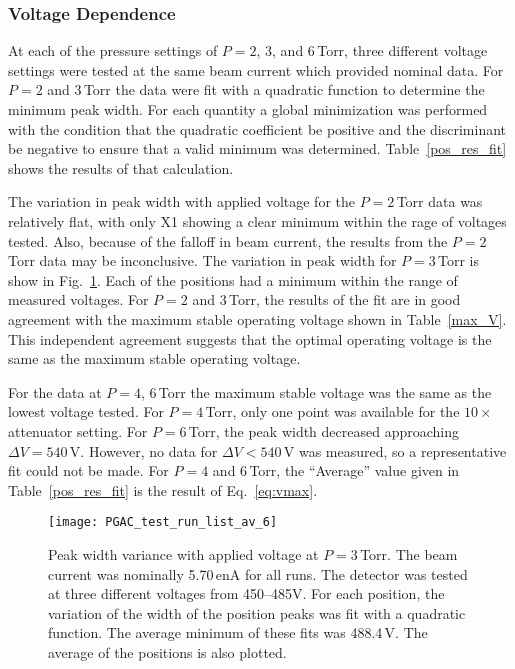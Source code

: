 \subsubsection{Voltage Dependence}
At each of the pressure settings of $P=2$, 3, and 6\,Torr, three different voltage settings were tested at the same beam current which provided nominal data.
For $P=2$ and 3\,Torr  %
the data were fit with a quadratic function to determine 
the minimum peak width. %
For each quantity a global minimization was performed %
 with the condition that the quadratic coefficient be positive and the discriminant be negative to ensure that a valid minimum was determined.
Table~\ref{pos_res_fit} shows the results of that calculation.

The variation in peak width with applied voltage for the $P=2$\,Torr data was relatively flat, with only X1 showing a clear 
minimum within the rage of voltages tested. Also, because of the falloff in beam current, the results from the $P=2$\,Torr data may be inconclusive. 
The variation in peak width for $P=3$\,Torr is show in Fig.~\ref{min_fit}. Each of the positions had a minimum within the range of measured voltages.
For $P=2$ and 3\,Torr, the results of the fit are in good agreement with the maximum stable operating voltage shown in Table~\ref{max_V}. This independent agreement suggests that the optimal operating voltage is the same as the maximum stable operating voltage.

For the data at $P=4$, 6\,Torr the maximum stable voltage was %
the same as the lowest voltage tested. For $P=4$\,Torr, only one point was available for the $10\times$ attenuator setting. For $P=6$\,Torr, the peak width decreased approaching $\Delta V=540$\,V. However, no data for $\Delta V < 540$\,V was measured, so a representative fit could not be made. For $P=4$ and 6\,Torr, the ``Average'' value given in Table~\ref{pos_res_fit} is the result of Eq.~\ref{eq:vmax}.


\begin{figure}
\texttt{[image: PGAC\_test\_run\_list\_av\_6]}%
\caption{Peak width variance with applied voltage %
 at $P=3$\,Torr. The beam current was nominally 5.70\,enA for all runs. The detector was tested at three different voltages from 450--485V. For each position, the variation of the width of the position peaks was fit with a quadratic function.  The average minimum of these fits was 488.4\,V. The average of the positions is also plotted.}%
\label{min_fit}%
\end{figure}

